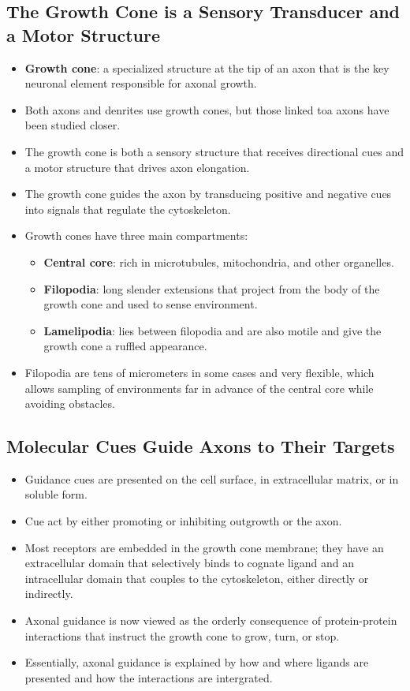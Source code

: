 \documentclass[12pt,a4paper]{article}
\begin{document}
\subsection{The Growth Cone is a Sensory Transducer and a Motor Structure}
\begin{itemize}
    \item \textbf{Growth cone}: a specialized structure at the tip of an axon that is the key neuronal element responsible for axonal growth.
    \item Both axons and denrites use growth cones, but those linked toa axons have been studied closer.
    \item The growth cone is both a sensory structure that receives directional cues and a motor structure that drives axon elongation.
    \item The growth cone guides the axon by transducing positive and negative cues into signals that regulate the cytoskeleton.
    \item Growth cones have three main compartments:
        \begin{itemize}
            \item \textbf{Central core}: rich in microtubules, mitochondria, and other organelles.
            \item \textbf{Filopodia}: long slender extensions that project from the body of the growth cone and used to sense environment.
            \item \textbf{Lamelipodia}: lies between filopodia and are also motile and give the growth cone  a ruffled appearance.
        \end{itemize}
    \item Filopodia are tens of micrometers in some cases and very flexible, which allows sampling of environments far in advance of the central core while avoiding obstacles.
\end{itemize}

\subsection{Molecular Cues Guide Axons to Their Targets}
\begin{itemize}
    \item Guidance cues are presented on the cell surface, in extracellular matrix, or in soluble form.
    \item Cue act by either promoting or inhibiting outgrowth or the axon.
    \item Most receptors are embedded in the growth cone membrane; they have an extracellular domain that selectively binds to cognate ligand and an intracellular domain that couples to the cytoskeleton, either directly or indirectly.
    \item Axonal guidance is now viewed as the orderly consequence of protein-protein interactions that instruct the growth cone to grow, turn, or stop.
    \item Essentially, axonal guidance is explained by how and where ligands are presented and how the interactions are intergrated.
\end{itemize}



\end{document}
